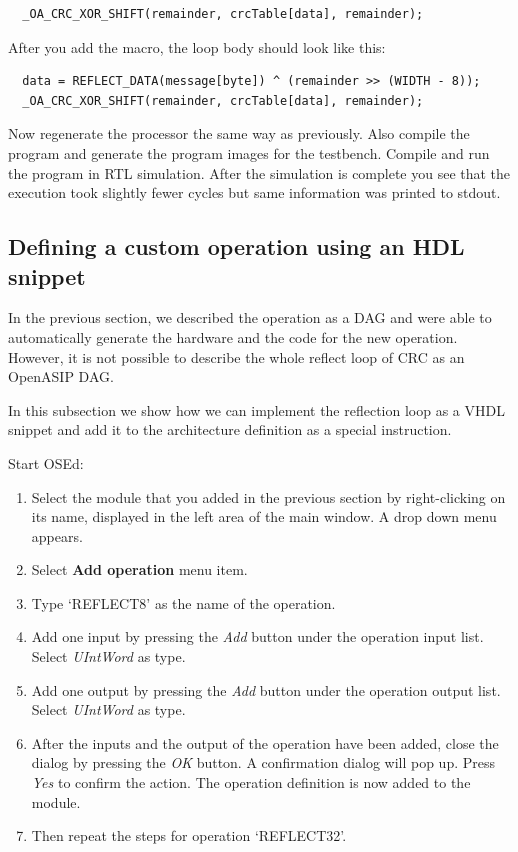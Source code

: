 \documentclass[a4paper,twoside]{tceusermanual}
\begin{document}
\begin{verbatim}
  _OA_CRC_XOR_SHIFT(remainder, crcTable[data], remainder);
\end{verbatim}

After you add the macro, the loop body should look like this:
\begin{verbatim}
  data = REFLECT_DATA(message[byte]) ^ (remainder >> (WIDTH - 8));
  _OA_CRC_XOR_SHIFT(remainder, crcTable[data], remainder);
\end{verbatim}

Now regenerate the processor the same way as previously. Also compile the
program and generate the program images for the testbench. Compile and run
the program in RTL simulation. After the simulation is complete you see that
the execution took slightly fewer cycles but same information was printed to stdout.

\subsection{Defining a custom operation using an HDL snippet}

In the previous section, we described the operation as a DAG and were able to
automatically generate the hardware and the code for the new operation. However, it is not
possible to describe the whole reflect loop of CRC as an OpenASIP DAG.

In this subsection we show how we can implement the reflection loop as a VHDL
snippet and add it to the architecture definition as a special instruction.

Start OSEd: 

\begin{enumerate}

\item%
  Select the module that you added in the previous section by right-clicking
  on its name, displayed in the left area of the main window.
  A drop down menu appears.
\item%
  Select \textbf{Add operation} menu item.
\item%
  Type `REFLECT8' as the name of the operation.
\item%
  Add one input by pressing the \emph{Add} button under the operation input
  list. Select \textit{UIntWord} as type.
\item%
  Add one output by pressing the \emph{Add} button under the operation output
  list. Select \textit{UIntWord} as type.
\item%
  After the inputs and the output of the operation have been added, close
  the dialog by pressing the \emph{OK} button. A confirmation dialog will pop
  up. Press \emph{Yes} to confirm the action. The operation definition is
  now added to the module.
\item%
  Then repeat the steps for operation `REFLECT32'.
\end{enumerate}
\end{document}
